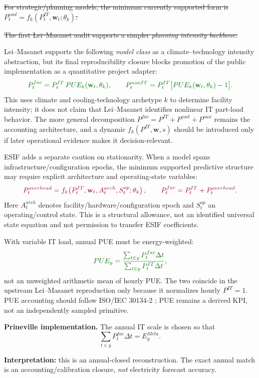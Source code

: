 \documentclass[11pt]{article}
\newcommand{\oldtxt}[1]{\textcolor{blue!70!black}{\sout{#1}}}
\newcommand{\newtxt}[1]{\textcolor{green!45!black}{#1}}
\newcommand{\latesttxt}[1]{\textcolor{purple!85!black}{#1}}
\begin{document}
\oldtxt{For strategic/planning models, the minimum currently supported form is \(P^{cool}_t=f_k(P^{IT}_t,\mathbf w_t;\theta_k)\).}

\oldtxt{The first Lei--Masanet audit supports a simpler \emph{planning intensity backbone}:}

\latesttxt{Lei--Masanet supports the following \emph{model class} as a climate--technology intensity abstraction, but its final reproducibility closure blocks promotion of the public implementation as a quantitative project adapter:}
\[
{\color{green!45!black}
P^{fac}_t
=
P^{IT}_t\,PUE_k(\mathbf w_t,\theta_k),
\qquad
P^{nonIT}_t
=
P^{IT}_t\bigl[PUE_k(\mathbf w_t,\theta_k)-1\bigr].
}
\]
\newtxt{This uses climate and cooling-technology archetype \(k\) to determine facility intensity; it does not claim that Lei--Masanet identifies nonlinear IT part-load behavior. The more general decomposition \(P^{fac}=P^{IT}+P^{cool}+P^{aux}\) remains the accounting architecture, and a dynamic \(f_k(P^{IT},\mathbf w,s)\) should be introduced only if later operational evidence makes it decision-relevant.}

\latesttxt{ESIF adds a separate caution on stationarity. When a model spans infrastructure/configuration epochs, the minimum supported predictive structure may require explicit architecture and operating-state variables:}
\[
{\color{purple!85!black}
P^{overhead}_t
=
f_k\!\left(P^{IT}_t,\mathbf w_t,A^{arch}_t,S^{op}_t;\theta_k\right),
\qquad
P^{fac}_t=P^{IT}_t+P^{overhead}_t.
}
\]
\latesttxt{Here \(A^{arch}_t\) denotes facility/hardware/configuration epoch and \(S^{op}_t\) an operating/control state. This is a structural allowance, not an identified universal state equation and not permission to transfer ESIF coefficients.}

\newtxt{With variable IT load, annual PUE must be energy-weighted:}
\[
{\color{green!45!black}
PUE_y
=
\frac{\sum_{t\in y}P^{fac}_t\Delta t}
     {\sum_{t\in y}P^{IT}_t\Delta t},
}
\]
\newtxt{not an unweighted arithmetic mean of hourly PUE. The two coincide in the upstream Lei--Masanet reproduction only because it normalizes hourly \(P^{IT}=1\). PUE accounting should follow ISO/IEC 30134-2 \cite{isoPUE}; PUE remains a derived KPI, not an independently sampled primitive.}

\textbf{Prineville implementation.} The annual IT scale is chosen so that
\[
\sum_{t\in y}P^{fac}_t\Delta t=E^{Meta}_y.
\]

\textbf{Interpretation:} this is an annual-closed reconstruction. The exact annual match is an accounting/calibration closure, \emph{not} electricity forecast accuracy.
\end{document}

